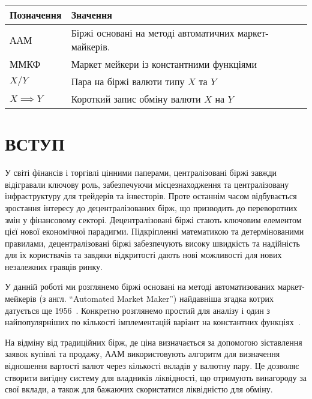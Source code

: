 \documentclass[14pt]{extarticle}
\begin{document}
\begin{center}
	\begin{tabular}{ll}
		Позначення       & Значення                                               \\[0pt]
		\hline
		ААМ              & Біржі основані на методі автоматичних маркет-майкерів. \\[0pt]
		ММКФ             & Маркет мейкери із константними функціями               \\[0pt]
		\(X/Y\)          & Пара на біржі валюти типу \(X\) та \(Y\)               \\[0pt]
		\(X \implies Y\) & Короткий запис обміну валюти \(X\) на \(Y\)            \\[0pt]
	\end{tabular}
\end{center}

\newpage

\section{ВСТУП}\label{sec:intro}

У світі фінансів і торгівлі цінними паперами, централізовані біржі завжди
відігравали ключову роль, забезпечуючи місцезнаходження та централізовану
інфраструктуру для трейдерів та інвесторів. Проте останнім часом відбувається
зростання інтересу до децентралізованих бірж, що призводить до переворотних змін
у фінансовому секторі. Децентралізовані біржі стають ключовим елементом цієї
нової економічної парадигми. Підкріпленні математикою та детермінованими
правилами, децентралізовані біржі забезпечують високу швидкість та надійність
для їх користвачів та завдяки відкритості дають нові можливості для нових
незалежних гравців ринку.

У данній роботі ми розглянемо біржі основані на методі автоматизованих
маркет-мейкерів (з англ. ``Automated Market Maker'') найдавніша згадка котрих
датується ще 1956~\cite{mccarthy}. Конкретно розглянемо простий для аналізу і
один з найпопулярніших по кількості імплементацій варіант на константних
функціях~\cite{angeris_2023}.

На відміну від традиційних бірж, де ціна
визначається за допомогою зіставлення заявок купівлі та продажу, ААМ
використовують алгоритм для визначення відношення вартості валют через кількості
вкладів у валютну пару. Це дозволяє створити вигідну систему для владників
ліквідності, що отримують винагороду за свої вклади, а також для бажаючих
скористатися ліквідністю для обміну.
\end{document}
